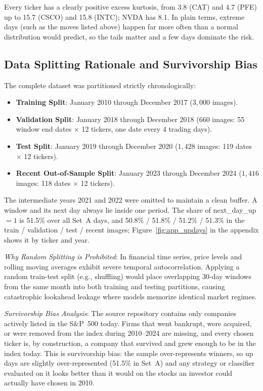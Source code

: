 \documentclass[10pt,journal]{IEEEtran}
\begin{document}
Every ticker has a clearly positive excess kurtosis, from 3.8 (CAT) and 4.7 (PFE) up to 15.7 (CSCO) and 15.8 (INTC); NVDA has 8.1. In plain terms, extreme days (such as the moves listed above) happen far more often than a normal distribution would predict, so the tails matter and a few days dominate the risk.

\subsection{Data Splitting Rationale and Survivorship Bias}
The complete dataset was partitioned strictly chronologically:
\begin{itemize}
  \item \textbf{Training Split}: January 2010 through December 2017 ($3,000$ images).
  \item \textbf{Validation Split}: January 2018 through December 2018 ($660$ images: 55 window end dates $\times$ 12 tickers, one date every 4 trading days).
  \item \textbf{Test Split}: January 2019 through December 2020 ($1{,}428$ images: 119 dates $\times$ 12 tickers).
  \item \textbf{Recent Out-of-Sample Split}: January 2023 through December 2024 ($1{,}416$ images: 118 dates $\times$ 12 tickers).
\end{itemize}
The intermediate years 2021 and 2022 were omitted to maintain a clean buffer. A window and its next day always lie inside one period. The share of next\_day\_up $=1$ is 51.5\% over all Set~A days, and 50.8\% / 51.8\% / 51.2\% / 51.3\% in the train / validation / test / recent images; Figure~\ref{fig:app_updays} in the appendix shows it by ticker and year. 

\textit{Why Random Splitting is Prohibited}: In financial time series, price levels and rolling moving averages exhibit severe temporal autocorrelation. Applying a random train-test split (e.g., shuffling) would place overlapping 30-day windows from the same month into both training and testing partitions, causing catastrophic lookahead leakage where models memorize identical market regimes.

\textit{Survivorship Bias Analysis}: The source repository contains only companies actively listed in the S\&P~500 today. Firms that went bankrupt, were acquired, or were removed from the index during 2010--2024 are missing, and every chosen ticker is, by construction, a company that survived and grew enough to be in the index today. This is survivorship bias: the sample over-represents winners, so up days are slightly over-represented (51.5\% in Set~A) and any strategy or classifier evaluated on it looks better than it would on the stocks an investor could actually have chosen in 2010.
\end{document}
